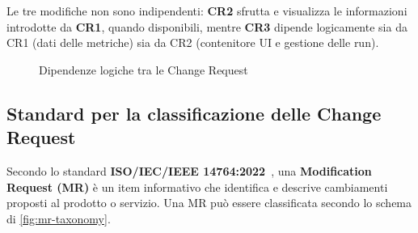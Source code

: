 \documentclass[11pt,a4paper]{article}
\begin{document}
Le tre modifiche non sono indipendenti: \textbf{CR2} sfrutta e visualizza le
informazioni introdotte da \textbf{CR1}, quando disponibili, mentre
\textbf{CR3} dipende logicamente sia da CR1 (dati delle metriche) sia da CR2
(contenitore UI e gestione delle run).

\begin{figure}[H]
  \centering
  \caption{Dipendenze logiche tra le Change Request}
  \label{fig:cr-deps}
\end{figure}

\subsection{Standard per la classificazione delle Change Request}
\label{sec:cr-standard}

Secondo lo standard \textbf{ISO/IEC/IEEE 14764:2022}~\cite{iso14764}, una
\textbf{Modification Request (MR)} \`e un item informativo che identifica e
descrive cambiamenti proposti al prodotto o servizio. Una MR pu\`o essere
classificata secondo lo schema di \cref{fig:mr-taxonomy}.
\end{document}
